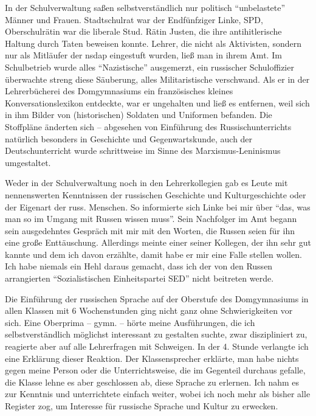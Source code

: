 \documentclass[a5paper,pagesize,10pt,twoside=true]{scrbook}
\renewcommand{\marginpar}[2][]{}
\begin{document}
In der Schulverwaltung saßen selbstverständlich nur politisch \enquote{unbelastete} Männer und Frauen. Stadtschulrat war der Endfünfziger Linke, SPD, Oberschulrätin war die liberale Stud. Rätin Justen, die ihre antihitlerische Haltung durch Taten beweisen konnte. Lehrer, die nicht als Aktivisten, sondern nur als Mitläufer der \ac{nsdap} eingestuft wurden, ließ man in ihrem Amt. Im Schulbetrieb wurde alles \enquote{Nazistische} ausgemerzt, ein russischer Schuloffizier überwachte streng diese Säuberung, alles Militaristische verschwand. Als er in der Lehrerbücherei des Domgymnasiums ein französisches kleines Konversationslexikon entdeckte, war er ungehalten und ließ es entfernen, weil sich in ihm Bilder von (historischen) Soldaten und Uniformen befanden. Die Stoffpläne änderten sich -- abgesehen von Einführung des Russischunterrichts natürlich besonders in Geschichte und Gegenwartskunde, auch der Deutschunterricht wurde schrittweise im Sinne des Marxismus-Leninismus umgestaltet.

Weder in der Schulverwaltung noch in den Lehrerkollegien gab es Leute mit nennenswerten Kenntnissen der russischen Geschichte und Kulturgeschichte oder der Eigenart der russ. Menschen. So informierte sich Linke bei mir über \enquote{das, was man so im Umgang mit Russen wissen muss}. Sein Nachfolger im Amt begann sein ausgedehntes Gespräch mit mir mit den Worten, die Russen seien für ihn eine große Enttäuschung. Allerdings meinte einer seiner Kollegen, der ihn sehr gut kannte und dem ich davon erzählte, damit habe er mir eine Falle stellen wollen. Ich habe niemals ein Hehl daraus gemacht, dass ich der von den Russen arrangierten \enquote{Sozialistischen Einheitspartei SED} nicht beitreten werde.

\marginpar{127} Die Einführung der russischen Sprache auf der Oberstufe des Domgymnasiums in allen Klassen mit 6 Wochenstunden ging nicht ganz ohne Schwierigkeiten vor sich. Eine Oberprima -- gymn. -- hörte meine Ausführungen, die ich selbstverständlich möglichst interessant zu gestalten suchte, zwar diszipliniert zu, reagierte aber auf alle Lehrerfragen mit Schweigen. In der 4. Stunde verlangte ich eine Erklärung dieser Reaktion. Der Klassensprecher erklärte, man habe nichts gegen meine Person oder die Unterrichtsweise, die im Gegenteil durchaus gefalle, die Klasse lehne es aber geschlossen ab, diese Sprache zu erlernen. Ich nahm es zur Kenntnis und unterrichtete einfach weiter, wobei ich noch mehr als bisher alle Register zog, um Interesse für russische Sprache und Kultur zu erwecken.
\end{document}
